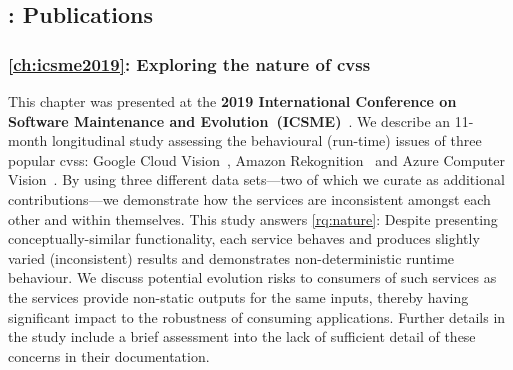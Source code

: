\subsection[Part II: Publications]{: Publications}

\subsubsection[Chapter 4: Exploring the nature of CVSs]{\cref{ch:icsme2019}: Exploring the nature of \glspl{cvs}} This chapter was presented at the \textbf{2019 International Conference on Software Maintenance and Evolution~(ICSME)}~\citep{Cummaudo:2019icsme}. We describe an 11-month longitudinal study assessing the behavioural (run-time) issues of three popular \glspl{cvs}: Google Cloud Vision~, Amazon Rekognition~ and Azure Computer Vision~. By using three different data sets---two of which we curate as additional contributions---we demonstrate how the services are inconsistent amongst each other and within themselves. This study answers \ref{rq:nature}: Despite presenting conceptually-similar functionality, each service behaves and produces slightly varied (inconsistent) results and demonstrates non-deterministic runtime behaviour. We discuss potential evolution risks to consumers of such services as the services provide non-static outputs for the same inputs, thereby having significant impact to the robustness of consuming applications. Further details in the study include a brief assessment into the lack of sufficient detail of these concerns in their documentation.

